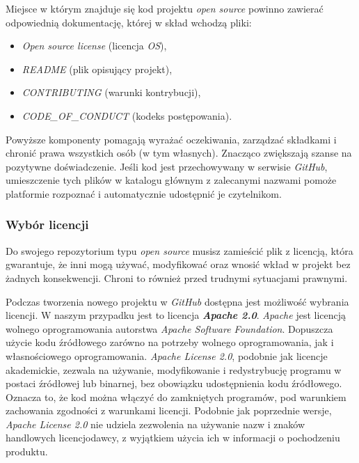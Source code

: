 \documentclass{article}
\begin{document}
\hspace{4mm} Miejsce w którym znajduje się kod projektu \emph{open source} powinno zawierać odpowiednią dokumentację, której w skład wchodzą pliki:
\begin{itemize}
    \item \emph{Open source license} (licencja \emph{OS}),
    \item \emph{README} (plik opisujący projekt),
    \item \emph{CONTRIBUTING} (warunki kontrybucji),
    \item \emph{CODE\_OF\_CONDUCT} (kodeks postępowania).
\end{itemize}
Powyższe komponenty pomagają wyrażać oczekiwania, zarządzać składkami i chronić prawa wszystkich osób (w tym własnych). Znacząco zwiększają szanse na pozytywne doświadczenie. Jeśli kod jest przechowywany w serwisie \emph{GitHub}, umieszczenie tych plików w katalogu głównym z zalecanymi nazwami pomoże platformie rozpoznać i automatycznie udostępnić je czytelnikom\cite{opensource.guide}.

\subsubsection{Wybór licencji}

\hspace{4mm} Do swojego repozytorium typu \emph{open source} musisz zamieścić plik z licencją, która gwarantuje, że inni mogą używać, modyfikować oraz wnosić wkład w projekt bez żadnych konsekwencji. Chroni to również przed trudnymi sytuacjami prawnymi\cite{opensource.guide}. 

Podczas tworzenia nowego projektu w \emph{GitHub} dostępna jest możliwość wybrania licencji. W naszym przypadku jest to licencja \textbf{\emph{Apache 2.0}}. \emph{Apache} jest licencją wolnego oprogramowania autorstwa \emph{Apache Software Foundation}. Dopuszcza użycie kodu źródłowego zarówno na potrzeby wolnego oprogramowania, jak i własnościowego oprogramowania. \emph{Apache License 2.0}, podobnie jak licencje akademickie, zezwala na używanie, modyfikowanie i redystrybucję programu w postaci źródłowej lub binarnej, bez obowiązku udostępnienia kodu źródłowego. Oznacza to, że kod można włączyć do zamkniętych programów, pod warunkiem zachowania zgodności z warunkami licencji. Podobnie jak poprzednie wersje, \emph{Apache License 2.0} nie udziela zezwolenia na używanie nazw i znaków handlowych licencjodawcy, z wyjątkiem użycia ich w informacji o pochodzeniu produktu\cite{apache}.
\end{document}
